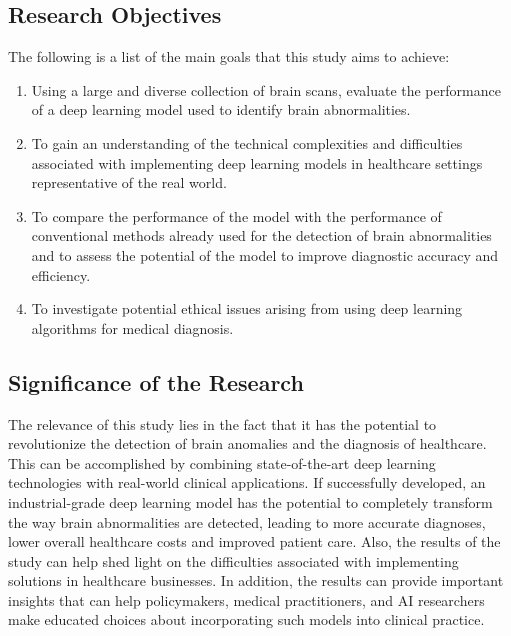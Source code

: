 \subsection{Research Objectives}
The following is a list of the main goals that this study aims to achieve:
    \begin{enumerate}
        \item Using a large and diverse collection of brain scans, evaluate the performance of a deep learning model used to identify brain abnormalities.
   
    \item  To gain an understanding of the technical complexities and difficulties associated with implementing deep learning models in healthcare settings representative of the real world.
    \item  To compare the performance of the model with the performance of conventional methods already used for the detection of brain abnormalities and to assess the potential of the model to improve diagnostic accuracy and efficiency.
    \item  To investigate potential ethical issues arising from using deep learning algorithms for medical diagnosis.
     \end{enumerate}

\subsection{Significance of the Research}
The relevance of this study lies in the fact that it has the potential to revolutionize the detection of brain anomalies and the diagnosis of healthcare. This can be accomplished by combining state-of-the-art deep learning technologies with real-world clinical applications. If successfully developed, an industrial-grade deep learning model has the potential to completely transform the way brain abnormalities are detected, leading to more accurate diagnoses, lower overall healthcare costs and improved patient care. Also, the results of the study can help shed light on the difficulties associated with implementing solutions in healthcare businesses. In addition, the results can provide important insights that can help policymakers, medical practitioners, and AI researchers make educated choices about incorporating such models into clinical practice.

